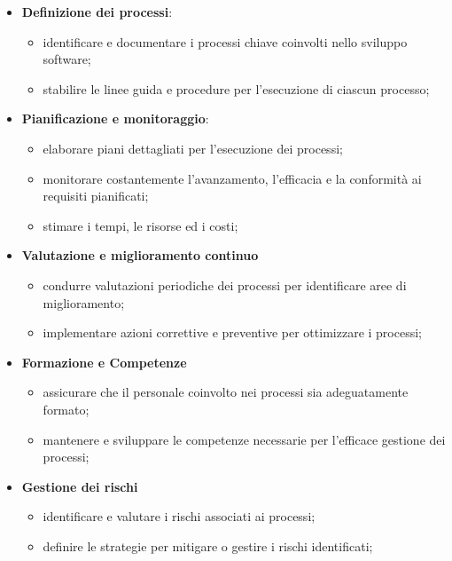 \begin{itemize}
    \item \textbf{Definizione dei processi}:
        \begin{itemize}
            \item identificare e documentare i processi chiave coinvolti nello sviluppo software;
            \item stabilire le linee guida e procedure per l'esecuzione di ciascun processo;
        \end{itemize}
    \item \textbf{Pianificazione e monitoraggio}:
        \begin{itemize}
            \item elaborare piani dettagliati per l'esecuzione dei processi;
            \item monitorare costantemente l'avanzamento, l'efficacia e la conformità ai requisiti pianificati;
            \item stimare i tempi, le risorse ed i costi;
        \end{itemize}
    \item \textbf{Valutazione e miglioramento continuo}
        \begin{itemize}
            \item condurre valutazioni periodiche dei processi per identificare aree di miglioramento;
            \item implementare azioni correttive e preventive per ottimizzare i processi;
        \end{itemize}
    \item \textbf{Formazione e Competenze}
        \begin{itemize}
            \item assicurare che il personale coinvolto nei processi sia adeguatamente formato;
            \item mantenere e sviluppare le competenze necessarie per l'efficace gestione dei processi;
        \end{itemize}
    \item \textbf{Gestione dei rischi}
        \begin{itemize}
            \item identificare e valutare i rischi associati ai processi;
            \item definire le strategie per mitigare o gestire i rischi identificati;
        \end{itemize}
\end{itemize}

